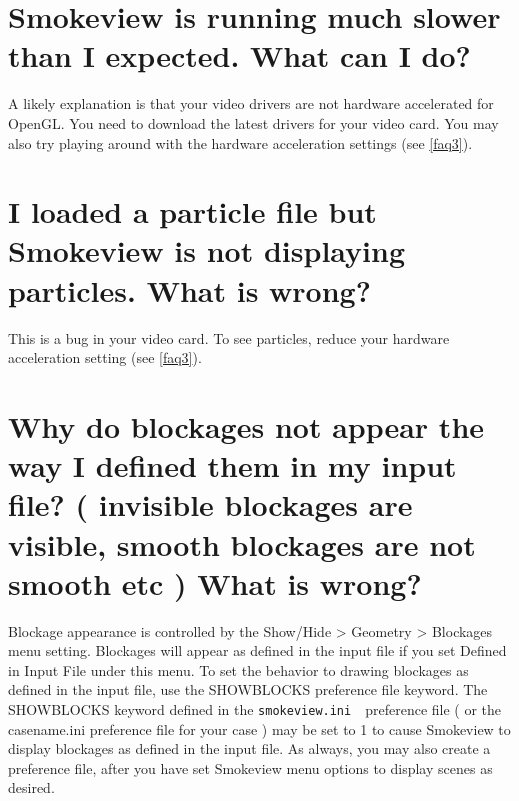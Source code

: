 \documentclass[11pt,twoside]{book}
\newcommand{\svini}{{\tt smokeview.ini}\ }
\begin{document}
\section{Smokeview is running much slower than I expected. What can I do?}

A likely explanation is that your video drivers are not hardware
accelerated for OpenGL. You need to download the latest drivers
for your video card. You may also try playing around with the
hardware acceleration settings (see \ref{faq3}).

\section{I loaded a particle file but Smokeview is not
displaying particles. What is wrong?}

This is a bug in your video card. To see particles, reduce your
hardware acceleration setting (see \ref{faq3}).

\section{Why do blockages not appear the way I defined them in
my input file? ( invisible blockages are visible, smooth blockages
are not smooth etc ) What is wrong?}

Blockage appearance is controlled by the Show/Hide > Geometry >
Blockages menu setting. Blockages will appear as defined in the
input file if you set Defined in Input File under this menu. To
set the behavior to drawing blockages as defined in the input
file, use the SHOWBLOCKS preference file keyword. The SHOWBLOCKS
keyword defined in the \svini\ preference file ( or the
casename.ini preference file for your case ) may be set to 1 to
cause Smokeview to display blockages as defined in the input file.
As always, you may also create a preference file, after you have
set Smokeview menu options to display scenes as desired.
\end{document}
